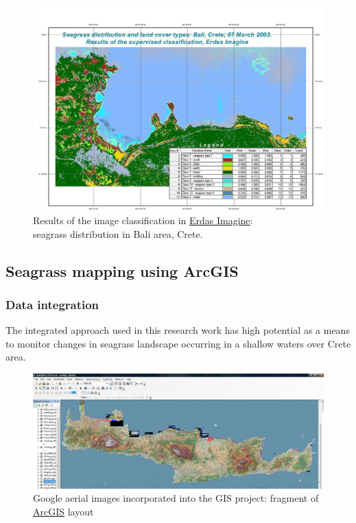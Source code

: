 \documentclass[10pt, a4paper]{article}
\begin{document}
\begin{figure}
	\begin{center}
		\includegraphics[scale=0.40]{Fig-36.jpg}
		\caption{Results of the image classification in \href{http://www.erdas.com/products/ERDASIMAGINE/ERDASIMAGINE/Details.aspx}{Erdas Imagine}: \\ seagrass distribution in Bali area, Crete. }
		\label{fig:38}
	\end{center}
\end{figure}

\subsection{Seagrass mapping using ArcGIS}

\subsubsection{Data integration}
The integrated approach used in this research work has high potential as a means to monitor changes
in seagrass landscape occurring in a shallow waters over Crete area.

\begin{figure}
	\begin{center}
		\includegraphics[scale=0.25]{Fig-37.jpg}
		\caption{Google aerial images incorporated into the GIS project: fragment of \href{http://www.esri.com/software/arcgis/index.html}{ArcGIS} layout}
		\label{fig:39}
	\end{center}
\end{figure}
\end{document}
